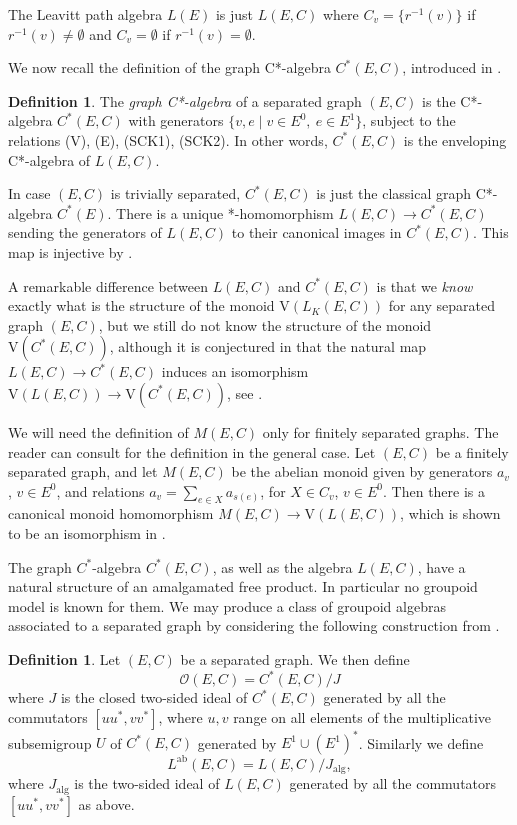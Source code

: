 \documentclass[11pt]{amsart}
\newcommand{\Lab}{L^{{\mathrm{ab}}}}
\theoremstyle{plain}            %
\theoremstyle{definition}       %
\newtheorem{definition}[theorem]{Definition}
\theoremstyle{definition}       %
\theoremstyle{remark}
\newcommand{\V}{\mathrm{V}}
\begin{document}
The Leavitt path algebra $L(E)$ is just $L(E,C)$ where $C_v= \{
r^{-1}(v)\}$ if $r^{-1}(v)\ne \emptyset $ and $C_v=\emptyset $ if
$r^{-1}(v)=\emptyset$. 


We now recall the definition of the graph C*-algebra $C^*(E,C)$,
introduced in \cite{ag12}.

\begin{definition} The \emph{graph C*-algebra} of a separated graph $(E,C)$ is the
	C*-algebra $C^*(E,C)$  with generators $\{ v, e \mid v\in E^0,\ e\in
	E^1 \}$, subject to the relations (V), (E), (SCK1), (SCK2). In other
	words, $C^*(E,C)$ is the enveloping C*-algebra of $L(E,C)$.
\end{definition}

In case $(E,C)$ is trivially separated, $C^*(E,C)$ is just the
classical graph C*-algebra $C^*(E)$. There is a unique
*-homomorphism  $L (E,C) \rightarrow
C^*(E,C)$ sending the generators of $L(E,C)$ to their canonical
images in $C^*(E,C)$. This map is injective by \cite[Theorem
3.8(1)]{ag12}.



A remarkable difference between $L(E,C)$ and $C^*(E,C)$ is that we {\it know} exactly what is the
structure of the monoid $\V (L_K(E,C))$ for any separated graph
$(E,C)$, but we still do not know the structure of the monoid
$\V (C^*(E,C))$, although it is conjectured in \cite{ag11} that the
natural map $L (E,C)\to C^*(E,C)$ induces an isomorphism
$\V (L(E,C))\to \V (C^*(E,C))$, see \cite[Problem 7.6]{ag11}. 


We will need the definition of $M(E,C)$ only for finitely separated
graphs. The reader can consult \cite{ag12} for the definition in the
general case. Let $(E,C)$ be a finitely separated graph, and let
$M(E,C)$ be the abelian monoid given by generators $a_v$, $v\in
E^0$, and relations $a_v=\sum _{e\in X} a_{s(e)}$, for $X\in C_v$,
$v\in E^0$. Then there is a canonical monoid homomorphism $M(E,C)\to
\V (L(E,C))$, which is shown to be an isomorphism in
\cite[Theorem 4.3]{ag12}. 

The graph $C^*$-algebra $C^*(E,C)$, as well as the algebra $L(E,C)$, have a natural structure of an amalgamated free product. In particular no groupoid model is known for them. We may produce a class of groupoid algebras associated to a separated graph by considering the following construction from \cite{ae14}.

\begin{definition}
	\label{def:algebrasOEC}
	Let $(E,C)$ be a separated graph. We then define 
	$$\mathcal O (E,C) = C^*(E,C)/J$$
	where $J$ is the closed two-sided ideal of $C^*(E,C)$ generated by all the commutators $[uu^*,vv^*]$, where $u,v$ range on all elements of the multiplicative subsemigroup $U$ of $C^*(E,C)$ generated by $E^1\cup (E^1)^*$. 
	Similarly we define
	$$\Lab (E,C) = L(E,C)/J_{\mathrm{alg}},$$
	where $J_{\mathrm{alg}}$ is the two-sided ideal of $L(E,C)$ generated by all the commutators  $[uu^*,vv^*]$ as above.  	
\end{definition}
\end{document}
